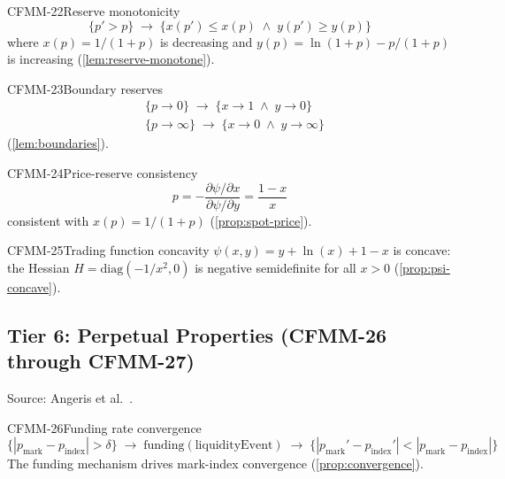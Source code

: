 \begin{invariant}{CFMM-22}{Reserve monotonicity}
\[
  \{p' > p\} \;\longrightarrow\; \{x(p') \leq x(p) \;\land\; y(p') \geq y(p)\}
\]
where $x(p) = 1/(1+p)$ is decreasing and $y(p) = \ln(1+p) - p/(1+p)$ is increasing
(\cref{lem:reserve-monotone}).
\end{invariant}

\begin{invariant}{CFMM-23}{Boundary reserves}
\begin{align*}
  &\{p \to 0\} \;\longrightarrow\; \{x \to 1 \;\land\; y \to 0\} \\
  &\{p \to \infty\} \;\longrightarrow\; \{x \to 0 \;\land\; y \to \infty\}
\end{align*}
(\cref{lem:boundaries}).
\end{invariant}

\begin{invariant}{CFMM-24}{Price-reserve consistency}
\[
  p = -\frac{\partial\psi/\partial x}{\partial\psi/\partial y}
    = \frac{1-x}{x}
\]
consistent with $x(p) = 1/(1+p)$ (\cref{prop:spot-price}).
\end{invariant}

\begin{invariant}{CFMM-25}{Trading function concavity}
$\psi(x,y) = y + \ln(x) + 1 - x$ is concave: the Hessian
$H = \text{diag}(-1/x^2, 0)$ is negative semidefinite for all $x > 0$
(\cref{prop:psi-concave}).
\end{invariant}

\subsection{Tier 6: Perpetual Properties (CFMM-26 through CFMM-27)}

Source: Angeris et al.\ \cite{angeris2022perpetuals}.

\begin{invariant}{CFMM-26}{Funding rate convergence}
\[
  \{|p_{\text{mark}} - p_{\text{index}}| > \delta\}
  \;\longrightarrow\; \text{funding}(\text{liquidityEvent})
  \;\longrightarrow\; \{|p_{\text{mark}}' - p_{\text{index}}'| < |p_{\text{mark}} - p_{\text{index}}|\}
\]
The funding mechanism drives mark-index convergence (\cref{prop:convergence}).
\end{invariant}

